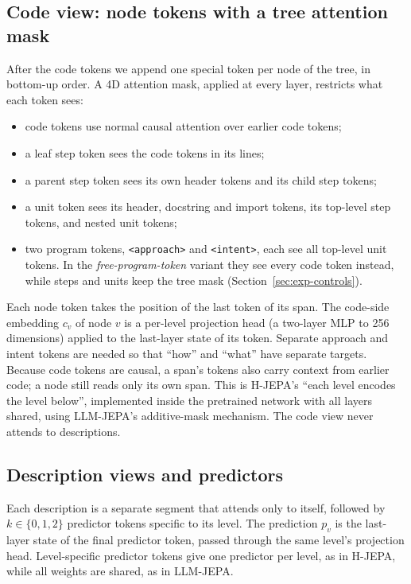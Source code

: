 \documentclass[11pt]{article}
\begin{document}
\subsection{Code view: node tokens with a tree attention mask}
After the code tokens we append one special token per node of the tree, in bottom-up order. A 4D attention mask,
applied at every layer, restricts what each token sees:
\begin{itemize}
  \item code tokens use normal causal attention over earlier code tokens;
  \item a leaf step token sees the code tokens in its lines;
  \item a parent step token sees its own header tokens and its child step tokens;
  \item a unit token sees its header, docstring and import tokens, its top-level step tokens, and nested unit tokens;
  \item two program tokens, \texttt{<approach>} and \texttt{<intent>}, each see all top-level unit tokens. In the
        \emph{free-program-token} variant they see every code token instead, while steps and units keep the tree mask
        (Section~\ref{sec:exp-controls}).
\end{itemize}
Each node token takes the position of the last token of its span. The code-side embedding $c_v$ of node $v$ is a
per-level projection head (a two-layer MLP to 256 dimensions) applied to the last-layer state of its token. Separate
approach and intent tokens are needed so that ``how'' and ``what'' have separate targets. Because code tokens are
causal, a span's tokens also carry context from earlier code; a node still reads only its own span. This is H-JEPA's
``each level encodes the level below'', implemented inside the pretrained network with all layers shared, using
LLM-JEPA's additive-mask mechanism. The code view never attends to descriptions.

\subsection{Description views and predictors}
Each description is a separate segment that attends only to itself, followed by $k\in\{0,1,2\}$ predictor tokens
specific to its level. The prediction $p_v$ is the last-layer state of the final predictor token, passed through the
same level's projection head. Level-specific predictor tokens give one predictor per level, as in H-JEPA, while all
weights are shared, as in LLM-JEPA.
\end{document}
